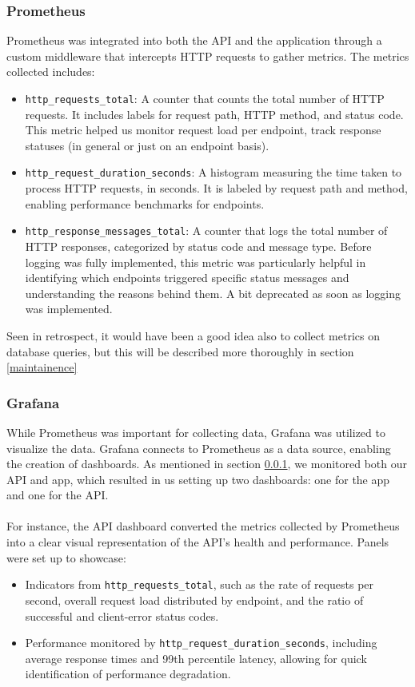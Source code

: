 \subsubsection{Prometheus}\label{prom}
Prometheus was integrated into both the API and the application through a custom middleware that intercepts HTTP requests to gather metrics. The metrics collected includes:

\begin{itemize}
\item \texttt{http\_requests\_total}: A counter that counts the total number of HTTP requests. It includes labels for request path, HTTP method, and status code. This metric helped us monitor request load per endpoint, track response statuses (in general or just on an endpoint basis).
\item \texttt{http\_request\_duration\_seconds}: A histogram measuring the time taken to process HTTP requests, in seconds. It is labeled by request path and method, enabling performance benchmarks for endpoints.
\item \texttt{http\_response\_messages\_total}: A counter that logs the total number of HTTP responses, categorized by status code and message type. Before logging was fully implemented, this metric was particularly helpful in identifying which endpoints triggered specific status messages and understanding the reasons behind them. A bit deprecated as soon as logging was implemented.
\end{itemize}
Seen in retrospect, it would have been a good idea also to collect metrics on database queries, but this will be described more thoroughly in section \ref{maintainence}

\subsubsection{Grafana}
While Prometheus was important for collecting data, Grafana was utilized to visualize the data. Grafana connects to Prometheus as a data source, enabling the creation of dashboards. As mentioned in section \ref{prom}, we monitored both our API and app, which resulted in us setting up two dashboards: one for the app and one for the API.
\\\\
For instance, the API dashboard converted the metrics collected by Prometheus into a clear visual representation of the API's health and performance. Panels were set up to showcase:
\begin{itemize}
    \item Indicators from \texttt{http\_requests\_total}, such as the rate of requests per second, overall request load distributed by endpoint, and the ratio of successful and client-error status codes.
    \item Performance monitored by \texttt{http\_request\_duration\_seconds}, including average response times and 99th percentile latency, allowing for quick identification of performance degradation.
\end{itemize}

